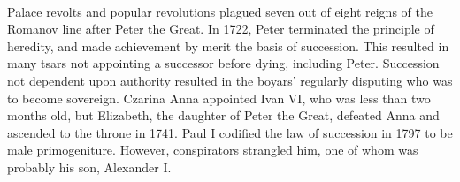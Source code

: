 \documentclass{article}
\begin{document}
\paragraph{} Palace revolts and popular revolutions plagued seven out of eight
reigns of the Romanov line after Peter the Great. In 1722, Peter
terminated the principle of heredity, and made achievement by merit
the basis of succession. This resulted in many tsars not appointing a
successor before dying, including Peter. Succession not dependent upon
authority resulted in the boyars' regularly disputing who was to
become sovereign. Czarina Anna appointed Ivan VI, who was less than
two months old, but Elizabeth, the daughter of Peter the Great,
defeated Anna and ascended to the throne in 1741. Paul I codified the
law of succession in 1797 to be male primogeniture. However,
conspirators strangled him, one of whom was probably his son,
Alexander I.



\end{document}
